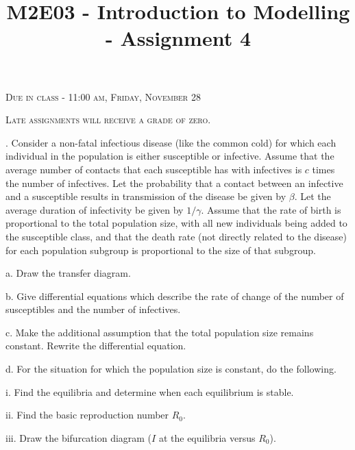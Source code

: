 \documentclass[reqno,12pt]{amsart}
\begin{document}
\title{M2E03 - Introduction to Modelling - Assignment 4}
\maketitle

\begin{center}


\textsc{Due in class - 11:00 am, Friday, November 28}

\textsc{Late assignments will receive a grade of zero.}
\end{center}

\vspace{1cm}

.  Consider a non-fatal infectious disease (like the common cold) for
which each individual in the population is either susceptible or infective.
Assume that the average number of contacts that each susceptible has
with infectives is $c$ times the number of infectives.  Let the probability
that a contact between an infective and a susceptible results in transmission
of the disease be given by $\beta$.  Let the average duration of infectivity
be given by $1/\gamma$.  Assume that the rate of birth is proportional to
the total population size, with all new individuals being added to the
susceptible class, and that the death rate (not directly related to the
disease) for each population subgroup is proportional to the size of that
subgroup.

\bigskip
\noindent
a.  Draw the transfer diagram.

\bigskip
\noindent
b.  Give differential equations which describe the rate of change
of the number of susceptibles and the number of infectives.

\bigskip
\noindent
c.  Make the additional assumption that the total population size
remains constant.  Rewrite the differential equation.

\bigskip
\noindent
d.  For the situation for which the population size is constant, do
the following.

i.\;\;  Find the equilibria and determine when each equilibrium is stable.

ii.\;  Find the basic reproduction number $R_0$.

iii. Draw the bifurcation diagram ($I$ at the equilibria versus $R_0$).
\end{document}
